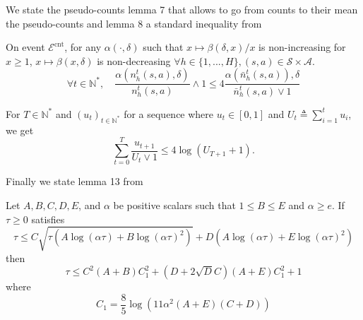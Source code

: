 \documentclass[final,12pt]{colt2026} %
\begin{document}
We state the pseudo-counts lemma 7 that allows to go from counts to their mean the pseudo-counts and lemma 8 a standard inequality from \citep{Menard2021Fast}
\begin{lemma}\label{pseudo-counts}
On event $\mathcal{E}^{\mathrm{cnt}}$, for any $\alpha(\cdot,\delta)$ such that $x \mapsto \beta(\delta, x)/x$ is non-increasing for $x \ge 1$, $x \mapsto \beta(x,\delta)$ is non-decreasing $\forall h \in \{1,...,H\}, (s, a) \in \mathcal{S} \times \mathcal{A}$.
$$
\forall t \in \mathbb{N}^*, \quad \frac{\alpha(n_h^t(s,a),\delta)}{n_h^t(s,a)} \wedge 1 \le 4 \frac{\alpha(\bar{n}_h^t(s,a)),\delta}{\bar{n}_h^t(s,a) \vee 1}
$$
\end{lemma}

\begin{lemma}
For $T \in \mathbb{N}^*$ and $(u_t)_{t \in \mathbb{N}^*}$ for a sequence where $u_t \in [0, 1]$ and $U_t \triangleq \sum_{i=1}^t u_i$, we get
$$
\sum_{t=0}^T \frac{u_{t+1}}{U_t \vee 1} \le 4 \log(U_{T+1} + 1).
$$
\end{lemma}
Finally we state lemma 13 from \citep{Menard2021Fast}
\begin{lemma}\label{inequality}
Let $A, B, C, D, E$, and $\alpha$ be positive scalars such that $1 \le B \le E$ and $\alpha \ge e$. If $\tau \ge 0$ satisfies
\begin{equation}
\tau \le C\sqrt{\tau \left(A \log(\alpha\tau) + B \log(\alpha\tau)^2\right)} + D\left(A \log(\alpha\tau) + E \log(\alpha\tau)^2\right) 
\end{equation}
then
$$
\tau \le C^2(A+B)C_1^2 + \left(D + 2\sqrt{D}C\right)(A+E)C_1^2 + 1
$$
where
$$
C_1 = \frac{8}{5}\log\left(11\alpha^2(A+E)(C+D)\right)
$$
\end{lemma}
\end{document}
